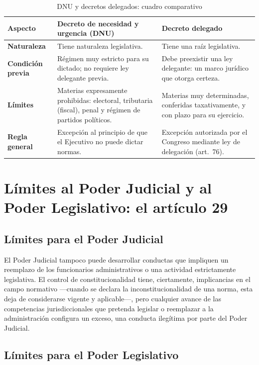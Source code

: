 \documentclass[12pt,oneside]{book}
\begin{document}
\begin{table}[H]
\centering
\caption{DNU y decretos delegados: cuadro comparativo}
\begin{tabularx}{\textwidth}{>{\raggedright\arraybackslash}p{} X X}
\toprule
\textbf{Aspecto} & \textbf{Decreto de necesidad y urgencia (DNU)} & \textbf{Decreto delegado} \\
\midrule
\textbf{Naturaleza} & Tiene naturaleza legislativa. & Tiene una raíz legislativa. \\
\textbf{Condición previa} & Régimen muy estricto para su dictado; no requiere ley delegante previa. & Debe preexistir una ley delegante: un marco jurídico que otorga certeza. \\
\textbf{Límites} & Materias expresamente prohibidas: electoral, tributaria (fiscal), penal y régimen de partidos políticos. & Materias muy determinadas, conferidas taxativamente, y con plazo para su ejercicio. \\
\textbf{Regla general} & Excepción al principio de que el Ejecutivo no puede dictar normas. & Excepción autorizada por el Congreso mediante ley de delegación (art.\ 76). \\
\bottomrule
\end{tabularx}
\end{table}

\section{Límites al Poder Judicial y al Poder Legislativo: el artículo 29}

\subsection{Límites para el Poder Judicial}

El Poder Judicial tampoco puede desarrollar conductas que impliquen un reemplazo de los funcionarios administrativos o una actividad estrictamente legislativa. El control de constitucionalidad tiene, ciertamente, implicancias en el campo normativo —cuando se declara la inconstitucionalidad de una norma, esta deja de considerarse vigente y aplicable—, pero cualquier avance de las competencias jurisdiccionales que pretenda legislar o reemplazar a la administración configura un exceso, una conducta ilegítima por parte del Poder Judicial.

\subsection{Límites para el Poder Legislativo}
\end{document}
